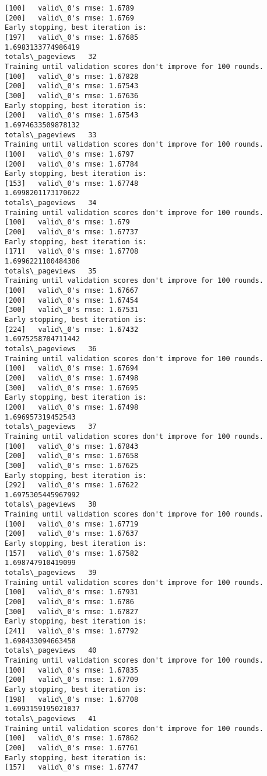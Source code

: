 \documentclass[11pt]{article}
\begin{document}
\begin{Verbatim}[commandchars=\\\{\}]
[100]	valid\_0's rmse: 1.6789
[200]	valid\_0's rmse: 1.6769
Early stopping, best iteration is:
[197]	valid\_0's rmse: 1.67685
1.6983133774986419
totals\_pageviews   32
Training until validation scores don't improve for 100 rounds.
[100]	valid\_0's rmse: 1.67828
[200]	valid\_0's rmse: 1.67543
[300]	valid\_0's rmse: 1.67636
Early stopping, best iteration is:
[200]	valid\_0's rmse: 1.67543
1.6974633509878132
totals\_pageviews   33
Training until validation scores don't improve for 100 rounds.
[100]	valid\_0's rmse: 1.6797
[200]	valid\_0's rmse: 1.67784
Early stopping, best iteration is:
[153]	valid\_0's rmse: 1.67748
1.6998201173170622
totals\_pageviews   34
Training until validation scores don't improve for 100 rounds.
[100]	valid\_0's rmse: 1.679
[200]	valid\_0's rmse: 1.67737
Early stopping, best iteration is:
[171]	valid\_0's rmse: 1.67708
1.6996221100484386
totals\_pageviews   35
Training until validation scores don't improve for 100 rounds.
[100]	valid\_0's rmse: 1.67667
[200]	valid\_0's rmse: 1.67454
[300]	valid\_0's rmse: 1.67531
Early stopping, best iteration is:
[224]	valid\_0's rmse: 1.67432
1.6975258704711442
totals\_pageviews   36
Training until validation scores don't improve for 100 rounds.
[100]	valid\_0's rmse: 1.67694
[200]	valid\_0's rmse: 1.67498
[300]	valid\_0's rmse: 1.67695
Early stopping, best iteration is:
[200]	valid\_0's rmse: 1.67498
1.696957319452543
totals\_pageviews   37
Training until validation scores don't improve for 100 rounds.
[100]	valid\_0's rmse: 1.67843
[200]	valid\_0's rmse: 1.67658
[300]	valid\_0's rmse: 1.67625
Early stopping, best iteration is:
[292]	valid\_0's rmse: 1.67622
1.6975305445967992
totals\_pageviews   38
Training until validation scores don't improve for 100 rounds.
[100]	valid\_0's rmse: 1.67719
[200]	valid\_0's rmse: 1.67637
Early stopping, best iteration is:
[157]	valid\_0's rmse: 1.67582
1.698747910419099
totals\_pageviews   39
Training until validation scores don't improve for 100 rounds.
[100]	valid\_0's rmse: 1.67931
[200]	valid\_0's rmse: 1.6786
[300]	valid\_0's rmse: 1.67827
Early stopping, best iteration is:
[241]	valid\_0's rmse: 1.67792
1.698433094663458
totals\_pageviews   40
Training until validation scores don't improve for 100 rounds.
[100]	valid\_0's rmse: 1.67835
[200]	valid\_0's rmse: 1.67709
Early stopping, best iteration is:
[198]	valid\_0's rmse: 1.67708
1.6993159195021037
totals\_pageviews   41
Training until validation scores don't improve for 100 rounds.
[100]	valid\_0's rmse: 1.67862
[200]	valid\_0's rmse: 1.67761
Early stopping, best iteration is:
[157]	valid\_0's rmse: 1.67747

\end{Verbatim}
\end{document}
